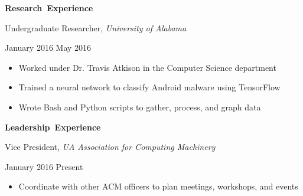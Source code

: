 \documentclass[11pt]{article}
\begin{document}
\vspace{0.8em}
\hbox{\large \textbf{Research Experience}}

\vspace{0.4em}
\begin{minipage}[t]{0.65\textwidth}
\flushleft
Undergraduate Researcher, \textit{University of Alabama}\\
\end{minipage}
\begin{minipage}[t]{0.3\textwidth}
\flushright
January 2016 \space \textemdash \space May 2016\\
\end{minipage}

\begin{itemize}
  \item Worked under Dr. Travis Atkison in the Computer Science department
  \item Trained a neural network to classify Android malware using TensorFlow
  \item Wrote Bash and Python scripts to gather, process, and graph data
\end{itemize}

\vspace{0.8em}
\hbox{\large \textbf{Leadership Experience}}

\vspace{0.4em}
\begin{minipage}[t]{0.7\textwidth}
\flushleft
Vice President, \textit{UA Association for Computing Machinery}\\
\end{minipage}
\begin{minipage}[t]{0.25\textwidth}
\flushright
January 2016 \space \textemdash \space Present\\
\end{minipage}

\begin{itemize}
  \item Coordinate with other ACM officers to plan meetings, workshops, and events
\end{itemize}
\end{document}

